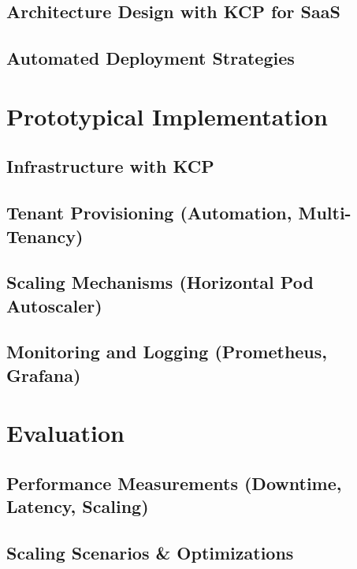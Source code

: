 \documentclass[11pt, a4paper, oneside]{scrartcl}
\begin{document}
        \subsection{Architecture Design with KCP for SaaS}

        \subsection{Automated Deployment Strategies}

    \section{Prototypical Implementation}

        \subsection{Infrastructure with KCP}

        \subsection[Tenant Provisioning]{Tenant Provisioning (Automation, Multi-Tenancy)}

        \subsection[Scaling Mechanisms]{Scaling Mechanisms (Horizontal Pod Autoscaler)}

        \subsection[Monitoring and Logging]{Monitoring and Logging (Prometheus, Grafana)}

    \section{Evaluation}

        \subsection[Performance Measurements]{Performance Measurements (Downtime, Latency, Scaling)}

        \subsection{Scaling Scenarios \& Optimizations}
\end{document}
